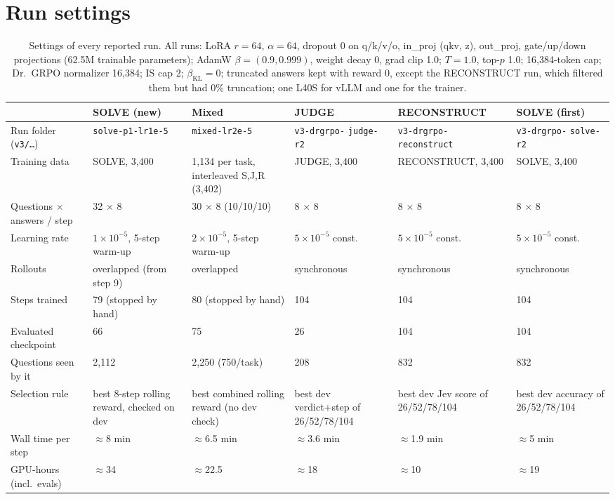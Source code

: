 \documentclass[10pt,a4paper]{article}
\begin{document}
\section{Run settings}

\begin{table}[H]
\centering\footnotesize
\caption{Settings of every reported run. All runs: LoRA $r=64$, $\alpha=64$, dropout 0 on q/k/v/o, in\_proj (qkv, z),
out\_proj, gate/up/down projections (62.5M trainable parameters); AdamW $\beta=(0.9,0.999)$, weight decay 0, grad
clip 1.0; $T=1.0$, top-$p$ 1.0; 16,384-token cap; Dr.~GRPO normalizer 16,384; IS cap 2; $\beta_{\text{KL}}=0$;
truncated answers kept with reward 0, except the RECONSTRUCT run, which filtered them but had 0\% truncation; one
L40S for vLLM and one for the trainer.}
\label{tab:settings}
\begin{tabular}{p{3.3cm}p{2.5cm}p{2.5cm}p{2.5cm}p{2.5cm}p{2.5cm}}
\toprule
 & SOLVE (new) & Mixed & JUDGE & RECONSTRUCT & SOLVE (first)\\
\midrule
Run folder (\texttt{v3/\dots}) & \texttt{solve-p1-lr1e-5} & \texttt{mixed-lr2e-5} & \texttt{v3-drgrpo-} \texttt{judge-r2} & \texttt{v3-drgrpo-} \texttt{reconstruct} & \texttt{v3-drgrpo-} \texttt{solve-r2}\\
Training data & SOLVE, 3,400 & 1,134 per task, interleaved S,J,R (3,402) & JUDGE, 3,400 & RECONSTRUCT, 3,400 & SOLVE, 3,400\\
Questions $\times$ answers / step & 32 $\times$ 8 & 30 $\times$ 8 (10/10/10) & 8 $\times$ 8 & 8 $\times$ 8 & 8 $\times$ 8\\
Learning rate & $1\times10^{-5}$, 5-step warm-up & $2\times10^{-5}$, 5-step warm-up & $5\times10^{-5}$ const. & $5\times10^{-5}$ const. & $5\times10^{-5}$ const.\\
Rollouts & overlapped (from step 9) & overlapped & synchronous & synchronous & synchronous\\
Steps trained & 79 (stopped by hand) & 80 (stopped by hand) & 104 & 104 & 104\\
Evaluated checkpoint & 66 & 75 & 26 & 104 & 104\\
Questions seen by it & 2,112 & 2,250 (750/task) & 208 & 832 & 832\\
Selection rule & best 8-step rolling reward, checked on dev & best combined rolling reward (no dev check) & best dev verdict+step of 26/52/78/104 & best dev Jev score of 26/52/78/104 & best dev accuracy of 26/52/78/104\\
Wall time per step & $\approx$8 min & $\approx$6.5 min & $\approx$3.6 min & $\approx$1.9 min & $\approx$5 min\\
GPU-hours (incl.\ evals) & $\approx$34 & $\approx$22.5 & $\approx$18 & $\approx$10 & $\approx$19\\
\bottomrule
\end{tabular}
\end{table}
\end{document}
